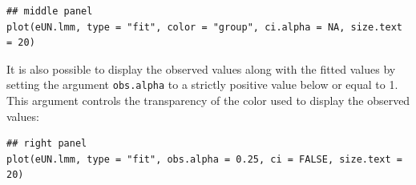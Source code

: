 \documentclass[12pt]{article}
\begin{document}
\lstset{language=r,label= ,caption= ,captionpos=b,numbers=none}
\begin{lstlisting}
## middle panel
plot(eUN.lmm, type = "fit", color = "group", ci.alpha = NA, size.text = 20)
\end{lstlisting}

\noindent It is also possible to display the observed values along with the
fitted values by setting the argument \texttt{obs.alpha} to a strictly
positive value below or equal to 1. This argument controls the
transparency of the color used to display the observed values:
\lstset{language=r,label= ,caption= ,captionpos=b,numbers=none}
\begin{lstlisting}
## right panel
plot(eUN.lmm, type = "fit", obs.alpha = 0.25, ci = FALSE, size.text = 20)
\end{lstlisting}
\end{document}
